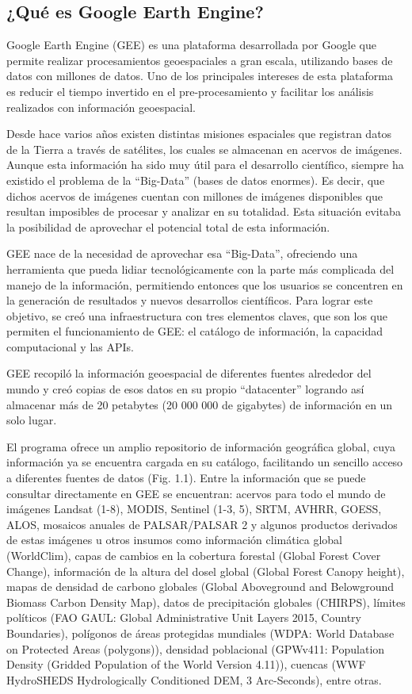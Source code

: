 \documentclass[
  12pt,
  letterpaper,
  twoside]{book}
\begin{document}
\hypertarget{quuxe9-es-google-earth-engine}{%
\subsection{¿Qué es Google Earth Engine?}\label{quuxe9-es-google-earth-engine}}

Google Earth Engine (GEE) es una plataforma desarrollada por Google que permite realizar procesamientos geoespaciales a gran escala, utilizando bases de datos con millones de datos. Uno de los principales intereses de esta plataforma es reducir el tiempo invertido en el pre-procesamiento y facilitar los análisis realizados con información geoespacial.

Desde hace varios años existen distintas misiones espaciales que registran datos de la Tierra a través de satélites, los cuales se almacenan en acervos de imágenes. Aunque esta información ha sido muy útil para el desarrollo científico, siempre ha existido el problema de la ``Big-Data'' (bases de datos enormes). Es decir, que dichos acervos de imágenes cuentan con millones de imágenes disponibles que resultan imposibles de procesar y analizar en su totalidad. Esta situación evitaba la posibilidad de aprovechar el potencial total de esta información.

GEE nace de la necesidad de aprovechar esa ``Big-Data'', ofreciendo una herramienta que pueda lidiar tecnológicamente con la parte más complicada del manejo de la información, permitiendo entonces que los usuarios se concentren en la generación de resultados y nuevos desarrollos científicos. Para lograr este objetivo, se creó una infraestructura con tres elementos claves, que son los que permiten el funcionamiento de GEE: el catálogo de información, la capacidad computacional y las APIs.

GEE recopiló la información geoespacial de diferentes fuentes alrededor del mundo y creó copias de esos datos en su propio ``datacenter'' logrando así almacenar más de 20 petabytes (20 000 000 de gigabytes) de información en un solo lugar.

El programa ofrece un amplio repositorio de información geográfica global, cuya información ya se encuentra cargada en su catálogo, facilitando un sencillo acceso a diferentes fuentes de datos (Fig. 1.1). Entre la información que se puede consultar directamente en GEE se encuentran: acervos para todo el mundo de imágenes Landsat (1-8), MODIS, Sentinel (1-3, 5), SRTM, AVHRR, GOESS, ALOS, mosaicos anuales de PALSAR/PALSAR 2 y algunos productos derivados de estas imágenes u otros insumos como información climática global (WorldClim), capas de cambios en la cobertura forestal (Global Forest Cover Change), información de la altura del dosel global (Global Forest Canopy height), mapas de densidad de carbono globales (Global Aboveground and Belowground Biomass Carbon Density Map), datos de precipitación globales (CHIRPS), límites políticos (FAO GAUL: Global Administrative Unit Layers 2015, Country Boundaries), polígonos de áreas protegidas mundiales (WDPA: World Database on Protected Areas (polygons)), densidad poblacional (GPWv411: Population Density (Gridded Population of the World Version 4.11)), cuencas (WWF HydroSHEDS Hydrologically Conditioned DEM, 3 Arc-Seconds), entre otras.
\end{document}
